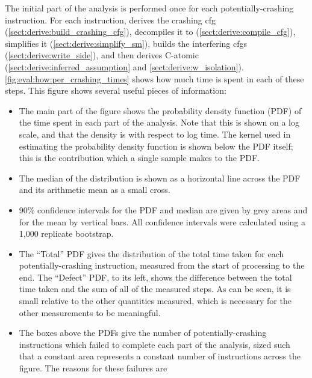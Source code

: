 \noindent
The initial part of the analysis is performed once for each
potentially-crashing instruction.  For each instruction, {\technique}
derives the crashing \gls{cfg}
(\autoref{sect:derive:build_crashing_cfg}), decompiles it to
{\AStateMachine} (\autoref{sect:derive:compile_cfg}), simplifies it
(\autoref{sect:derive:simplify_sm}), builds the interfering
\glspl{cfg} (\autoref{sect:derive:write_side}), and then derives
C-atomic (\autoref{sect:derive:inferred_assumption} and
\autoref{sect:derive:w_isolation}).
\autoref{fig:eval:how:per_crashing_times} shows how much time is spent
in each of these steps.  This figure shows several useful pieces of
information:
\begin{itemize}
\item The main part of the figure shows the probability density
  function (PDF) of the time spent in each part of the analysis.  Note
  that this is shown on a log scale, and that the density is with
  respect to log time.  The kernel used in estimating the probability
  density function is shown below the PDF itself; this is the
  contribution which a single sample makes to the PDF.
\item The median of the distribution is shown as a horizontal line
  across the PDF and its arithmetic mean as a small cross.
\item 90\% confidence intervals for the PDF and median are given by
  grey areas and for the mean by vertical bars.  All confidence
  intervals were calculated using a 1,000 replicate bootstrap.
\item The ``Total'' PDF gives the distribution of the total time taken
  for each potentially-crashing instruction, measured from the start
  of processing to the end.  The ``Defect'' PDF, to its left, shows
  the difference between the total time taken and the sum of all of
  the measured steps.  As can be seen, it is small relative to the
  other quantities measured, which is necessary for the other
  measurements to be meaningful.
\item The boxes above the PDFs give the number of potentially-crashing
  instructions which failed to complete each part of the analysis,
  sized such that a constant area represents a constant number of
  instructions across the figure.  The reasons for these failures are

\end{itemize}
